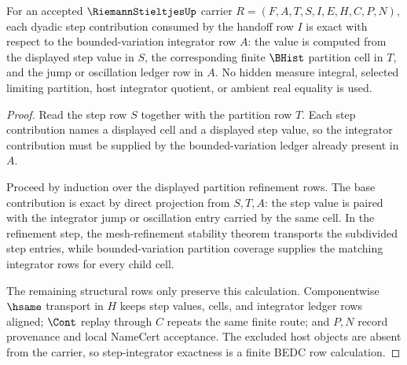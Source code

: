 \begin{theorem}
\label{thm:riemann-stieltjes-step-integrator-exactness}
For an accepted $\RiemannStieltjesUp$ carrier $R=(F,A,T,S,I,E,H,C,P,N)$, each dyadic step contribution consumed by the handoff row $I$ is exact with respect to the bounded-variation integrator row $A$: the value is computed from the displayed step value in $S$, the corresponding finite $\BHist$ partition cell in $T$, and the jump or oscillation ledger row in $A$. No hidden measure integral, selected limiting partition, host integrator quotient, or ambient real equality is used.
\end{theorem}
\begin{proof}
Read the step row $S$ together with the partition row $T$. Each step contribution names a displayed cell and a displayed step value, so the integrator contribution must be supplied by the bounded-variation ledger already present in $A$.

Proceed by induction over the displayed partition refinement rows. The base contribution is exact by direct projection from $S,T,A$: the step value is paired with the integrator jump or oscillation entry carried by the same cell. In the refinement step, the mesh-refinement stability theorem transports the subdivided step entries, while bounded-variation partition coverage supplies the matching integrator rows for every child cell.

The remaining structural rows only preserve this calculation. Componentwise $\hsame$ transport in $H$ keeps step values, cells, and integrator ledger rows aligned; $\Cont$ replay through $C$ repeats the same finite route; and $P,N$ record provenance and local NameCert acceptance. The excluded host objects are absent from the carrier, so step-integrator exactness is a finite BEDC row calculation.
\end{proof}

